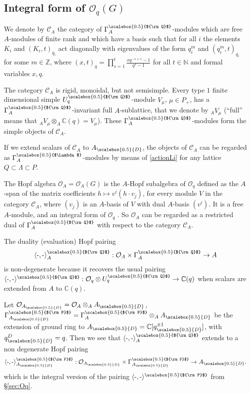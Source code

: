 \documentclass[11pt]{amsart}
\newcommand{\Oo}{\mathcal{O}}
\newcommand{\qD}{q_{\scalebox{0.5}{D}}}
\newcommand{\AD}{A_{\scalebox{0.5}{D}}}
\newcommand{\Q}{{\scalebox{0.5}{${\rm Q}$}}}
\newcommand{\D}{{\scalebox{0.5}{D}}}
\newcommand{\Pup}{{\scalebox{0.5}{${\rm P}$}}}
\newcommand{\Lam}{{\scalebox{0.5}{$\Lambda$}}}
\begin{document}
 
\subsection {Integral form of \texorpdfstring{$\Oo_q(G)$}{the quantum function algebra}}\label{integralO}
We denote by $\mathcal{C}_A$ the category of $\Gamma_A^\Q$-modules which are free $A$-modules of finite rank and which have a basis such that for all $i$ the elements $K_i$ and $(K_i,t)_{q_i}$ act diagonally with eigenvalues of the form $q_i^m$ and $(q_i^m,t)_{q_i}$ for some $m \in \mathbb{Z}$, where $\textstyle (x,t)_{q} = \prod_{s=1}^t \frac{xq^{-s+1}-1}{q^s-1}$ for all $t \in \mathbb{N}$ and formal variables $x,q$.

The category $\mathcal{C}_A$ is rigid, monoidal, but not semisimple. Every type $1$ finite dimensional simple $U_q^\Q$-module $V_\mu$, $\mu \in P_+$, has a $\Gamma_A^\Q$-invariant full $A$-sublattice, that we denote by ${}_AV_\mu$ (``full'' means that $_AV_\mu \otimes_A \mathbb{C}(q) = V_{\mu}$). These $\Gamma_A^\Q$-modules form the simple objects of $\mathcal{C}_A$.

If we extend scalars of ${\mathcal C}_A$ to $\AD$, the objects of $\mathcal{C}_A$ can be regarded as $\Gamma_A^\Lam$-modules by means of \eqref{actionLi} for any lattice $Q\subset \Lambda \subset P$.

The Hopf algebra $\Oo_A=\Oo_A(G)$ \cite{Lusztig2} is the $A$-Hopf subalgebra of $\Oo_q$ defined as the $A$-span of the matrix coefficients $h\mapsto v^i(h \cdot v_j)$, for every module $V$ in the category $\mathcal{C}_A$, where $(v_j)$ is an $A$-basis of $V$ with dual $A$-basis $(v^i)$. It is a free $A$-module, and an integral form of $\Oo_q$ \cite{Lusztig2,Lusztig}. So $\Oo_A$ can be regarded as a restricted dual of $\Gamma_A^\Q$ with respect to the category $\mathcal{C}_A$.

 The duality (evaluation) Hopf pairing
\begin{equation}\label{pairingA}\langle \text{-}, \text{-} \rangle_A^\Q :{\mathcal O}_A\times \Gamma_A^\Q \to A
\end{equation}
is non-degenerate because it recovers the usual pairing $\langle \text{-}, \text{-} \rangle^\Q : \mathcal{O}_q \otimes U^\Q_q \to \mathbb{C}(q)$ when scalars are extended from $A$ to ${\mathbb C}(q)$.

\indent Let $\mathcal{O}_{\AD} = \mathcal{O}_A \otimes_A \AD$, $\Gamma_{\AD}^\Pup = \Gamma_A^\Pup \otimes_A \AD$ be the extension of ground ring to $\AD = \mathbb{C}[\qD^{\pm 1}]$, with $\qD^D = q$. Then we see that $\langle \text{-},\text{-} \rangle_A^\Q$ extends to a non degenerate Hopf pairing
\begin{equation}\label{defpairAD}
\langle \text{-}, \text{-} \rangle_{\AD}^\Pup :{\mathcal O}_{\AD}\times \Gamma_{\AD}^\Pup\to A_{\D}.
\end{equation}
which is the integral version of the pairing $\langle \text{-},\text{-} \rangle^\Pup$ from \S \ref{sec:Oq}.
\end{document}
